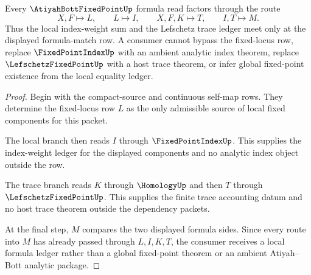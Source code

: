 \begin{theorem}
\label{thm:atiyah-bott-fixed-point-index-route}
Every $\AtiyahBottFixedPointUp$ formula read factors through the route
$$
X,F \longmapsto L,\qquad L \longmapsto I,\qquad X,F,K \longmapsto T,\qquad I,T \longmapsto M .
$$
Thus the local index-weight sum and the Lefschetz trace ledger meet only at the displayed formula-match row. A consumer cannot bypass the fixed-locus row, replace $\FixedPointIndexUp$ with an ambient analytic index theorem, replace $\LefschetzFixedPointUp$ with a host trace theorem, or infer global fixed-point existence from the local equality ledger.
\end{theorem}
\begin{proof}
Begin with the compact-source and continuous self-map rows. They determine the fixed-locus row $L$ as the only admissible source of local fixed components for this packet.

The local branch then reads $I$ through $\FixedPointIndexUp$. This supplies the index-weight ledger for the displayed components and no analytic index object outside the row.

The trace branch reads $K$ through $\HomologyUp$ and then $T$ through $\LefschetzFixedPointUp$. This supplies the finite trace accounting datum and no host trace theorem outside the dependency packets.

At the final step, $M$ compares the two displayed formula sides. Since every route into $M$ has already passed through $L,I,K,T$, the consumer receives a local formula ledger rather than a global fixed-point theorem or an ambient Atiyah--Bott analytic package.
\end{proof}


\begin{closurestatus}{\AtiyahBottFixedPointUp}
  \theoryclosure{\seedClosure}
  \formalstatus{\unformalizedV}
\end{closurestatus}
